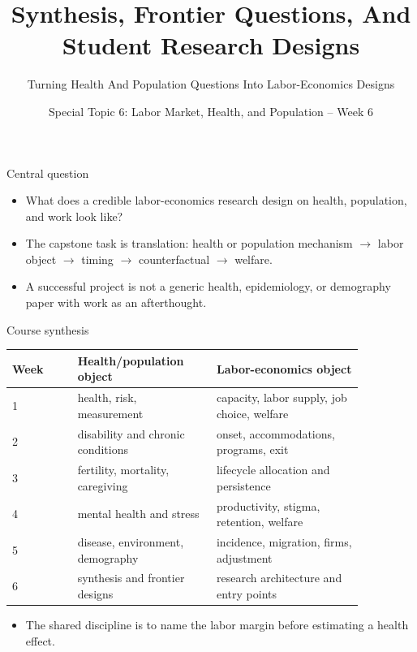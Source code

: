 \documentclass[aspectratio=169,11pt]{beamer}
\title{Synthesis, Frontier Questions, And Student Research Designs}
\subtitle{Turning Health And Population Questions Into Labor-Economics Designs}
\author{Special Topic 6: Labor Market, Health, and Population -- Week 6}
\date{}
\begin{document}
\begin{frame}
  \titlepage
\end{frame}

\begin{frame}{Central question}
\begin{itemize}
    \item What does a credible labor-economics research design on health, population, and work look like?
    \item The capstone task is translation: health or population mechanism $\rightarrow$ labor object $\rightarrow$ timing $\rightarrow$ counterfactual $\rightarrow$ welfare.
    \item A successful project is not a generic health, epidemiology, or demography paper with work as an afterthought.
\end{itemize}
\end{frame}

\begin{frame}{Course synthesis}
\small
\begin{tabular}{p{0.16\linewidth} p{0.34\linewidth} p{0.36\linewidth}}
\toprule
Week & Health/population object & Labor-economics object \\
\midrule
1 & health, risk, measurement & capacity, labor supply, job choice, welfare \\
2 & disability and chronic conditions & onset, accommodations, programs, exit \\
3 & fertility, mortality, caregiving & lifecycle allocation and persistence \\
4 & mental health and stress & productivity, stigma, retention, welfare \\
5 & disease, environment, demography & incidence, migration, firms, adjustment \\
6 & synthesis and frontier designs & research architecture and entry points \\
\bottomrule
\end{tabular}
\vspace{0.3cm}
\begin{itemize}
    \item The shared discipline is to name the labor margin before estimating a health effect.
\end{itemize}
\end{frame}
\end{document}
